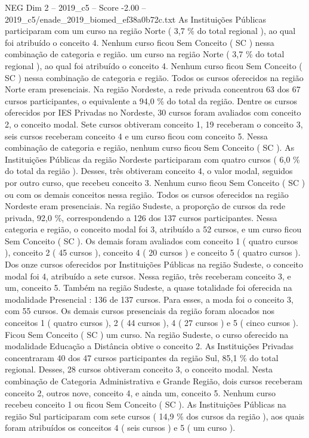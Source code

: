 \begin{textsample}{NEG Dim 2 – 2019\_c5 – Score -2.00 – 2019\_c5/enade\_2019\_biomed\_ef38a0b72c.txt}
As Instituições Públicas participaram com um curso na região Norte ( 3,7 \% do total regional ), ao qual foi atribuído o conceito 4.
Nenhum curso ficou Sem Conceito ( SC ) nessa combinação de categoria e região. um curso na região Norte ( 3,7 \% do total regional ), ao qual foi atribuído o conceito 4.
Nenhum curso ficou Sem Conceito ( SC ) nessa combinação de categoria e região.
Todos os cursos oferecidos na região Norte eram presenciais.
Na região Nordeste, a rede privada concentrou 63 dos 67 cursos participantes, o equivalente a 94,0 \% do total da região.
Dentre os cursos oferecidos por IES Privadas no Nordeste, 30 cursos foram avaliados com conceito 2, o conceito modal.
Sete cursos obtiveram conceito 1, 19 receberam o conceito 3, seis cursos receberam conceito 4 e um curso ficou com conceito 5.
Nessa combinação de categoria e região, nenhum curso ficou Sem Conceito ( SC ).
As Instituições Públicas da região Nordeste participaram com quatro cursos ( 6,0 \% do total da região ).
Desses, três obtiveram conceito 4, o valor modal, seguidos por outro curso, que recebeu conceito 3.
Nenhum curso ficou Sem Conceito ( SC ) ou com os demais conceitos nessa região.
Todos os cursos oferecidos na região Nordeste eram presenciais.
Na região Sudeste, a proporção de cursos da rede privada, 92,0 \%, correspondendo a 126 dos 137 cursos participantes.
Nessa categoria e região, o conceito modal foi 3, atribuído a 52 cursos, e um curso ficou Sem Conceito ( SC ).
Os demais foram avaliados com conceito 1 ( quatro cursos ), conceito 2 ( 45 cursos ), conceito 4 ( 20 cursos ) e conceito 5 ( quatro cursos ).
Dos onze cursos oferecidos por Instituições Públicas na região Sudeste, o conceito modal foi 4, atribuído a sete cursos.
Nessa região, três receberam conceito 3, e um, conceito 5.
Também na região Sudeste, a quase totalidade foi oferecida na modalidade Presencial : 136 de 137 cursos.
Para esses, a moda foi o conceito 3, com 55 cursos.
Os demais cursos presenciais da região foram alocados nos conceitos 1 ( quatro cursos ), 2 ( 44 cursos ), 4 ( 27 cursos ) e 5 ( cinco cursos ).
Ficou Sem Conceito ( SC ) um curso.
Na região Sudeste, o curso oferecido na modalidade Educação a Distância obtive o conceito 2.
As Instituições Privadas concentraram 40 dos 47 cursos participantes da região Sul, 85,1 \% do total regional.
Desses, 28 cursos obtiveram conceito 3, o conceito modal.
Nesta combinação de Categoria Administrativa e Grande Região, dois cursos receberam conceito 2, outros nove, conceito 4, e ainda um, conceito 5.
Nenhum curso recebeu conceito 1 ou ficou Sem Conceito ( SC ).
As Instituições Públicas na região Sul participaram com sete cursos ( 14,9 \% dos cursos da região ), aos quais foram atribuídos os conceitos 4 ( seis cursos ) e 5 ( um curso ).

\end{textsample}
